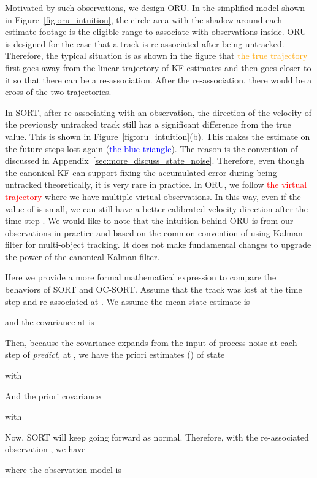 \documentclass[10pt,twocolumn,letterpaper]{article}
\begin{document}
Motivated by such observations, we design ORU. 
In the simplified model shown in Figure~\ref{fig:oru_intuition}, the circle area with the shadow around each estimate footage is the eligible range to associate with observations inside. ORU is designed for the case that a track is re-associated after being untracked. 
Therefore, the typical situation is as shown in the figure that \textcolor{orange}{the true trajectory}  first goes away from the linear trajectory of KF estimates and then goes closer to it so that there can be a re-association. 
After the re-association, there would be a cross of the two trajectories.

In SORT, after re-associating with an observation, the direction of the velocity of the previously untracked track still has a significant difference from the true value. 
This is shown in Figure~\ref{fig:oru_intuition}(b). This makes the estimate on the future steps lost again (\textcolor{blue}{the blue triangle}). The reason is the convention of  discussed in Appendix~\ref{sec:more_discuss_state_noise}.
Therefore, even though the canonical KF can support fixing the accumulated error during being untracked theoretically, it is very rare in practice. In ORU, we follow \textcolor{red}{the virtual trajectory} where we have multiple virtual observations. In this way, even if the value of  is small, we can still have a better-calibrated velocity direction after the time step . 
We would like to note that the intuition behind ORU is from our observations in practice and based on the common convention of using Kalman filter for multi-object tracking. It does not make fundamental changes to upgrade the power of the canonical Kalman filter.

Here we provide a more formal mathematical expression to compare the behaviors of SORT and OC-SORT. Assume that the track was lost at the time step  and re-associated at . We assume the mean state estimate is

and the covariance at  is 

Then, because the covariance expands from the input of process noise at each step of \textit{predict}, at , we have the priori estimates () of state

with

And the priori covariance

with


Now, SORT will keep going forward as normal. Therefore, with the re-associated observation , we have 

where the observation model is 
\end{document}
